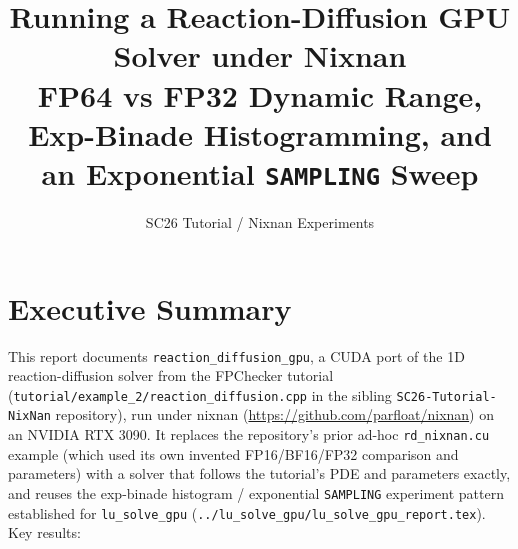 \documentclass[11pt,a4paper]{article}
\title{Running a Reaction-Diffusion GPU Solver under Nixnan\\
\large FP64 vs FP32 Dynamic Range, Exp-Binade Histogramming, and an
Exponential \texttt{SAMPLING} Sweep}
\author{SC26 Tutorial / Nixnan Experiments}
\date{}
\begin{document}
\maketitle

\section{Executive Summary}

This report documents \texttt{reaction\_diffusion\_gpu}, a CUDA port of the
1D reaction-diffusion solver from the FPChecker tutorial
(\texttt{tutorial/example\_2/reaction\_diffusion.cpp} in the sibling
\texttt{SC26-Tutorial-NixNan} repository), run under nixnan
(\url{https://github.com/parfloat/nixnan}) on an NVIDIA RTX 3090. It
replaces the repository's prior ad-hoc \texttt{rd\_nixnan.cu} example
(which used its own invented FP16/BF16/FP32 comparison and parameters) with
a solver that follows the tutorial's PDE and parameters exactly, and reuses
the exp-binade histogram / exponential \texttt{SAMPLING} experiment pattern
established for \texttt{lu\_solve\_gpu}
(\texttt{../lu\_solve\_gpu/lu\_solve\_gpu\_report.tex}). Key results:
\end{document}
